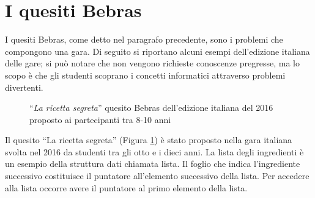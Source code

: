 \documentclass[12pt]{report}
\begin{document}
%
%
\section{I quesiti Bebras}

I quesiti Bebras, come detto nel paragrafo precedente, sono i problemi che compongono una gara.
Di seguito si riportano alcuni esempi dell'edizione italiana delle gare; si può notare che non vengono richieste conoscenze pregresse, ma lo scopo è che gli studenti scoprano i concetti informatici attraverso problemi divertenti.

\begin{figure}[H]
	\centering
	\caption{ ``\textit{La ricetta segreta}'' quesito Bebras dell'edizione italiana del 2016 proposto ai partecipanti tra 8-10 anni}\label{fig:ricetta}
\end{figure}

Il quesito ``La ricetta segreta'' (Figura \ref{fig:ricetta}) è stato proposto nella gara italiana svolta nel 2016 da studenti tra gli otto e i dieci anni.
La lista degli ingredienti è un esempio della struttura dati chiamata lista. Il foglio che indica l'ingrediente successivo costituisce il puntatore all'elemento successivo della lista. Per accedere alla lista occorre avere il puntatore al primo elemento della lista.
\end{document}

